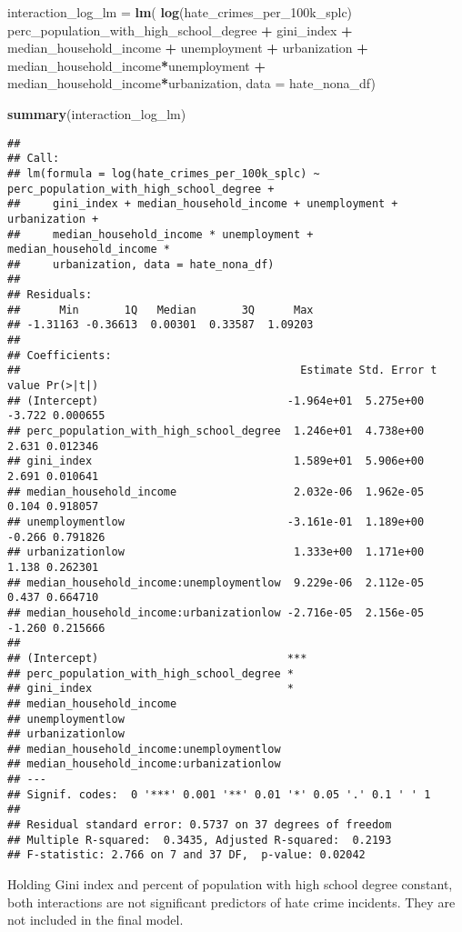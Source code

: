 \documentclass[
]{article}
\newenvironment{Shaded}{\begin{snugshade}}{\end{snugshade}}
\newcommand{\DataTypeTok}[1]{\textcolor[rgb]{0.13,0.29,0.53}{#1}}
\newcommand{\KeywordTok}[1]{\textcolor[rgb]{0.13,0.29,0.53}{\textbf{#1}}}
\newcommand{\NormalTok}[1]{#1}
\newcommand{\OperatorTok}[1]{\textcolor[rgb]{0.81,0.36,0.00}{\textbf{#1}}}
\newcommand{\StringTok}[1]{\textcolor[rgb]{0.31,0.60,0.02}{#1}}
\begin{document}
\begin{Shaded}
\begin{Highlighting}[]
\NormalTok{interaction_log_lm =}\StringTok{ }\KeywordTok{lm}\NormalTok{(}
  \KeywordTok{log}\NormalTok{(hate_crimes_per_100k_splc)}
  \OperatorTok{~}\StringTok{ }\NormalTok{perc_population_with_high_school_degree}
  \OperatorTok{+}\StringTok{ }\NormalTok{gini_index}
  \OperatorTok{+}\StringTok{ }\NormalTok{median_household_income }
  \OperatorTok{+}\StringTok{ }\NormalTok{unemployment }\OperatorTok{+}\StringTok{ }\NormalTok{urbanization }
  \OperatorTok{+}\StringTok{ }\NormalTok{median_household_income}\OperatorTok{*}\NormalTok{unemployment }
  \OperatorTok{+}\StringTok{ }\NormalTok{median_household_income}\OperatorTok{*}\NormalTok{urbanization,}
  \DataTypeTok{data =}\NormalTok{ hate_nona_df)}

\KeywordTok{summary}\NormalTok{(interaction_log_lm)}
\end{Highlighting}
\end{Shaded}

\begin{verbatim}
## 
## Call:
## lm(formula = log(hate_crimes_per_100k_splc) ~ perc_population_with_high_school_degree + 
##     gini_index + median_household_income + unemployment + urbanization + 
##     median_household_income * unemployment + median_household_income * 
##     urbanization, data = hate_nona_df)
## 
## Residuals:
##      Min       1Q   Median       3Q      Max 
## -1.31163 -0.36613  0.00301  0.33587  1.09203 
## 
## Coefficients:
##                                           Estimate Std. Error t value Pr(>|t|)
## (Intercept)                             -1.964e+01  5.275e+00  -3.722 0.000655
## perc_population_with_high_school_degree  1.246e+01  4.738e+00   2.631 0.012346
## gini_index                               1.589e+01  5.906e+00   2.691 0.010641
## median_household_income                  2.032e-06  1.962e-05   0.104 0.918057
## unemploymentlow                         -3.161e-01  1.189e+00  -0.266 0.791826
## urbanizationlow                          1.333e+00  1.171e+00   1.138 0.262301
## median_household_income:unemploymentlow  9.229e-06  2.112e-05   0.437 0.664710
## median_household_income:urbanizationlow -2.716e-05  2.156e-05  -1.260 0.215666
##                                            
## (Intercept)                             ***
## perc_population_with_high_school_degree *  
## gini_index                              *  
## median_household_income                    
## unemploymentlow                            
## urbanizationlow                            
## median_household_income:unemploymentlow    
## median_household_income:urbanizationlow    
## ---
## Signif. codes:  0 '***' 0.001 '**' 0.01 '*' 0.05 '.' 0.1 ' ' 1
## 
## Residual standard error: 0.5737 on 37 degrees of freedom
## Multiple R-squared:  0.3435, Adjusted R-squared:  0.2193 
## F-statistic: 2.766 on 7 and 37 DF,  p-value: 0.02042
\end{verbatim}

Holding Gini index and percent of population with high school degree
constant, both interactions are not significant predictors of hate crime
incidents. They are not included in the final model.
\end{document}
